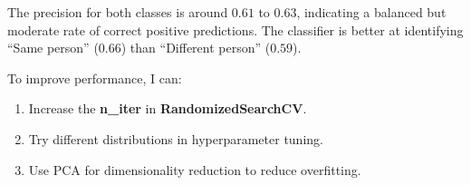\begin{solution}
    The precision for both classes is around $0.61$ to $0.63$, indicating a balanced but moderate rate of correct positive predictions.
    The classifier is better at identifying ``Same person'' ($0.66$) than ``Different person'' ($0.59$).

     To improve performance, I can:

    \begin{enumerate}
        \item { Increase the \textbf{n\_iter} in \textbf{RandomizedSearchCV}. }
        \item { Try different distributions in hyperparameter tuning. }
        \item { Use PCA for dimensionality reduction to reduce overfitting. }
    \end{enumerate}
\end{solution}